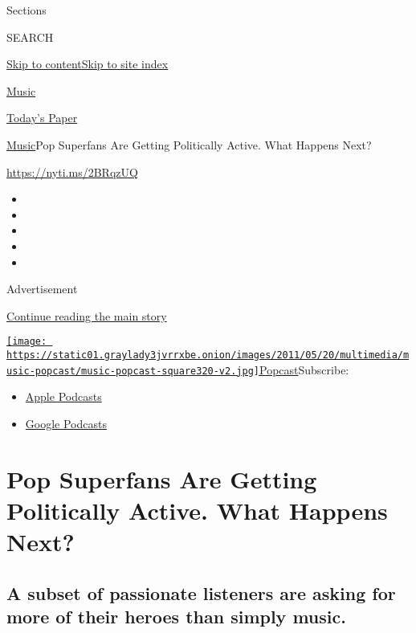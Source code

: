 Sections

SEARCH

\protect\hyperlink{site-content}{Skip to
content}\protect\hyperlink{site-index}{Skip to site index}

\href{https://www.nytimes3xbfgragh.onion/section/arts/music}{Music}

\href{https://myaccount.nytimes3xbfgragh.onion/auth/login?response_type=cookie\&client_id=vi}{}

\href{https://www.nytimes3xbfgragh.onion/section/todayspaper}{Today's
Paper}

\href{/section/arts/music}{Music}\textbar{}Pop Superfans Are Getting
Politically Active. What Happens Next?

\href{https://nyti.ms/2BRqzUQ}{https://nyti.ms/2BRqzUQ}

\begin{itemize}
\item
\item
\item
\item
\item
\end{itemize}

Advertisement

\protect\hyperlink{after-top}{Continue reading the main story}

\href{https://www.nytimes3xbfgragh.onion/column/popcast-pop-music-podcast}{\texttt{[image: https://static01.graylady3jvrrxbe.onion/images/2011/05/20/multimedia/music-popcast/music-popcast-square320-v2.jpg]}Popcast}Subscribe:

\begin{itemize}
\tightlist
\item
  \href{https://itunes.apple.com/us/podcast/id120315823}{Apple Podcasts}
\item
  \href{https://play.google.com/music/listen?u=0\#/ps/Izaidkcp4ffluag7z7wuzica2su}{Google
  Podcasts}
\end{itemize}

\hypertarget{pop-superfans-are-getting-politically-active-what-happens-next}{%
\section{Pop Superfans Are Getting Politically Active. What Happens
Next?}\label{pop-superfans-are-getting-politically-active-what-happens-next}}

\hypertarget{a-subset-of-passionate-listeners-are-asking-for-more-of-their-heroes-than-simply-music}{%
\subsection{A subset of passionate listeners are asking for more of
their heroes than simply
music.}\label{a-subset-of-passionate-listeners-are-asking-for-more-of-their-heroes-than-simply-music}}

